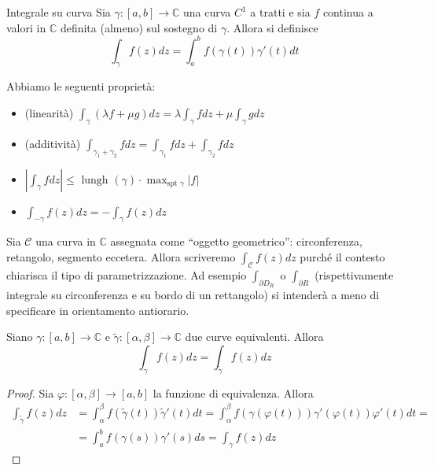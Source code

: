 \begin{definition}{Integrale su curva}
    Sia \(\gamma : [a,b] \to \mathbb{C}\) una curva \(C^{1}\) a tratti e sia
    \(f\) continua a valori in \(\mathbb{C}\) definita (almeno) sul sostegno di
    \(\gamma\). Allora si definisce
    \[
        \int_{\gamma} f(z) dz = \int_{a}^{b} f(\gamma(t)) \gamma'(t) dt
    \]
\end{definition}
Abbiamo le seguenti proprietà:
\begin{itemize}[label = --]
    \item (linearità) \(\displaystyle \int_{\gamma} \left( \lambda f + \mu g
        \right) dz = \lambda \int_{\gamma} f dz + \mu \int_{\gamma} g dz\)
    \item (additività) \(\displaystyle \int_{\gamma_1 + \gamma_2} f dz =
        \int_{\gamma_1} f dz + \int_{\gamma_2} f dz\)
    \item \(\displaystyle \left| \int_{\gamma} f dz \right| \le \text{ lungh
        }(\gamma) \cdot \max_{\text{spt } \gamma } |f|  \) 
    \item \(\displaystyle \int_{-\gamma} f(z) dz = - \int_{\gamma} f(z)dz\) 
\end{itemize}

Sia \(\mathcal{C}\) una curva in \(\mathbb{C}\) assegnata come ``oggetto
geometrico'': circonferenza, retangolo, segmento eccetera. Allora scriveremo
\(
    \int_{\mathcal{C}} f(z) dz
\)
purché il contesto chiarisca il tipo di parametrizzazione. Ad esempio
\(
    \int_{\partial D_R} 
\) o \(
    \int_{\partial R}
\) (rispettivamente integrale su circonferenza e su bordo di un rettangolo) si intenderà a meno di specificare in orientamento antiorario.

\begin{proposition}
    Siano \(\gamma : [a,b] \to \mathbb{C}\) e \(\tilde{\gamma} : [\alpha, \beta]
    \to \mathbb{C}\) due curve equivalenti. Allora
    \[
        \int_{\gamma} f(z) dz = \int_{\tilde{\gamma}} f(z) dz
    \]
\end{proposition}
\begin{proof}
    Sia \(\varphi : [\alpha, \beta] \to [a,b]\) la funzione di equivalenza. Allora
    \begin{align*}
        \int_{\tilde{\gamma}} f(z) dz &= \int_{\alpha}^{\beta} f(\tilde{\gamma}(t))
        \tilde{\gamma}'(t) dt = \int_{\alpha}^{\beta} f(\gamma(\varphi(t)))
        \gamma'(\varphi(t)) \varphi'(t) dt = \\&= \int_{a}^{b} f(\gamma(s)) \gamma'(s)
        ds = \int_{\gamma} f(z) dz
    \end{align*}
\end{proof}

